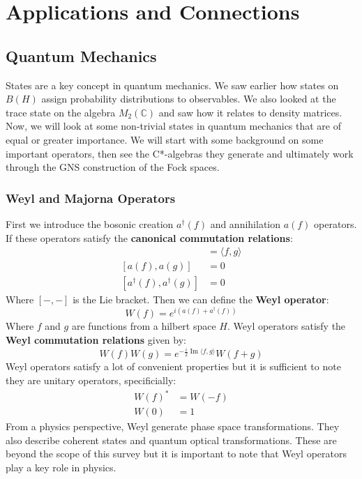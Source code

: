 \section{Applications and Connections}
\subsection{Quantum Mechanics}
States are a key concept in quantum mechanics. We saw earlier how states on $B(H)$
assign probability distributions to observables. We also looked at the trace state
on the algebra $M_2(\mathbb{C})$ and saw how it relates to density matrices. Now,
we will look at some non-trivial states in quantum mechanics that are of equal
or greater importance. We will start with some background on some important operators,
then see the C*-algebras they generate and ultimately work through the GNS construction
of the Fock spaces.
\subsubsection{Weyl and Majorna Operators}
First we introduce the bosonic creation $a^\dagger(f)$ and annihilation $a(f)$ operators.
If these operators satisfy the \textbf{canonical commutation relations}:
\begin{align}
    [ a(f), a^\dagger(g) ] &= \langle f,g \rangle\\
    [a(f), a(g)] &= 0\\
    [a^\dagger(f), a^\dagger(g)] &= 0
\end{align}
Where $[- , -]$ is the Lie bracket. Then we can define the \textbf{Weyl operator}:
\begin{equation}
    W(f) = e^{i(a(f)+a^\dagger(f))}
\end{equation}
Where $f$ and $g$ are functions from a hilbert space $H$. Weyl operators satisfy
the \textbf{Weyl commutation relations} given by:
\begin{equation}
    W(f) W(g) = e^{-\frac{i}{2} \operatorname{Im} \langle f, g \rangle} W(f+g)
\end{equation}
Weyl operators satisfy a lot of convenient properties but it is sufficient to note they
are unitary operators, specificially:
\begin{align*}
    W(f)^* &= W(-f)\\
    W(0) &= 1
\end{align*}
From a physics perspective, Weyl generate phase space transformations. They also
describe coherent states and quantum optical transformations. These are beyond the 
scope of this survey but it is important to note that Weyl operators play a key
role in physics.\newline


